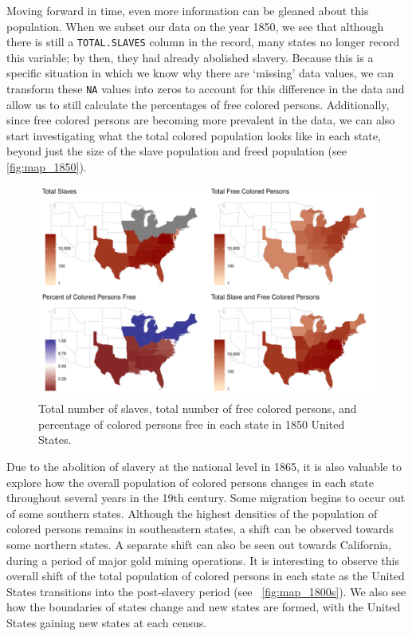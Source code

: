 \documentclass[DIV=calc, paper=a4, fontsize=10pt, twocolumn]{scrartcl}\usepackage[]{graphicx}\usepackage[]{color}
\newenvironment{knitrout}{}{} %
\begin{document}
\par Moving forward in time, even more information can be gleaned about this population. When we subset our data on the year 1850, we see that although there is still a \texttt{TOTAL.SLAVES} column in the record, many states no longer record this variable; by then, they had already abolished slavery. Because this is a specific situation in which we know why there are `missing' data values, we can transform these \texttt{NA} values into zeros to account for this difference in the data and allow us to still calculate the percentages of free colored persons. Additionally, since free colored persons are becoming more prevalent in the data, we can also start investigating what the total colored population looks like in each state, beyond just the size of the slave population and freed population (see \autoref{fig:map_1850}).


\begin{knitrout}
\color{fgcolor}\begin{figure}[h]
\includegraphics[width=.5\textwidth]{figure/map_1850-1} \caption[Total number of slaves, total number of free colored persons, and percentage of colored persons free in each state in 1850 United States]{Total number of slaves, total number of free colored persons, and percentage of colored persons free in each state in 1850 United States.}\label{fig:map_1850}
\end{figure}


\end{knitrout}

\par Due to the abolition of slavery at the national level in 1865, it is also valuable to explore how the overall population of colored persons changes in each state throughout several years in the 19th century. Some migration begins to occur out of some southern states. Although the highest densities of the population of colored persons remains in southeastern states, a shift can be observed towards some northern states. A separate shift can also be seen out towards California, during a period of major gold mining operations. It is interesting to observe this overall shift of the total population of colored persons in each state as the United States transitions into the post-slavery period (see ~\autoref{fig:map_1800s}). We also see how the boundaries of states change and new states are formed, with the United States gaining new states at each census.  
\end{document}
